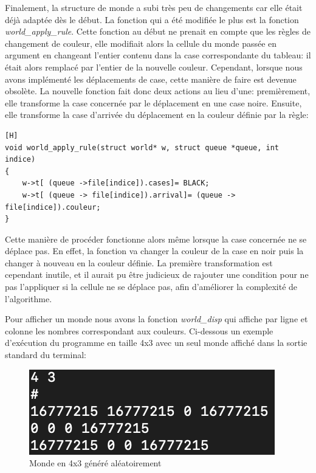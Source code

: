 \documentclass[11pt, a4paper]{article}
\begin{document}
Finalement, la structure de monde a subi très peu de changements car elle était déjà adaptée dès le début. La fonction qui a été modifiée le plus est la fonction \textit{world\_apply\_rule}. Cette fonction au début ne prenait en compte que les règles de changement de couleur, elle modifiait alors la cellule du monde passée en argument en changeant l'entier contenu dans la case correspondante du tableau: il était alors remplacé par l'entier de la nouvelle couleur.
Cependant, lorsque nous avons implémenté les déplacements de case, cette manière de faire est devenue obsolète.
La nouvelle fonction fait donc deux actions au lieu d'une: premièrement, elle transforme la case concernée par le déplacement en une case noire. Ensuite, elle transforme la case d'arrivée du déplacement en la couleur définie par la règle:

\begin{lstlisting}[basicstyle=\footnotesize,frame = single][H]
void world_apply_rule(struct world* w, struct queue *queue, int indice)
{ 
    w->t[ (queue ->file[indice]).cases]= BLACK;
    w->t[ (queue -> file[indice]).arrival]= (queue -> file[indice]).couleur;
}
\end{lstlisting}


Cette manière de procéder fonctionne alors même lorsque la case concernée ne se déplace pas. En effet, la fonction va changer la couleur de la case en noir puis la changer à nouveau en la couleur définie. La première transformation est cependant inutile, et il aurait pu être judicieux de rajouter une condition pour ne pas l'appliquer si la cellule ne se déplace pas, afin d'améliorer la complexité de l'algorithme.

Pour afficher un monde nous avons la fonction \textit{world\_disp} qui affiche par ligne et colonne les nombres correspondant aux couleurs. Ci-dessous un exemple d'exécution du programme en taille 4x3 avec un seul monde affiché dans la sortie standard du terminal:
\begin{figure}[!h]
    \centering
    \includegraphics{world_disp.png}
    \caption{Monde en 4x3 généré aléatoirement}
    \label{fig:my_label}
\end{figure}
\end{document}
